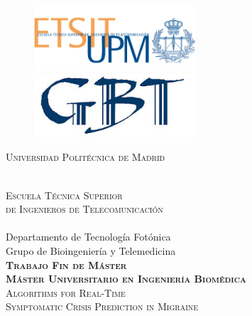 \begin{titlepage}
\setlength{\headheight}{0pt}
\setlength{\footskip}{0pt}
\setlength{\topmargin}{0pt}

\begin{center}

\begin{figure}[ht]
\begin{minipage}[b]{0.45\linewidth}
\centering
\vfill  
\includegraphics[width=6cm]{images/etsit_small}
\end{minipage}
\hspace{2cm}
\begin{minipage}[b]{0.45\linewidth}
\centering
\vfill  
\includegraphics[width=6cm]{images/gbt}
\end{minipage}
\end{figure}


\vspace*{1cm}

\LARGE
\textsc{Universidad Politécnica de Madrid}

\smallskip
\hfill
\\
\textsc{Escuela Técnica Superior\\ de Ingenieros de Telecomunicación}\\ 
\smallskip
\hfill
\\
Departamento de Tecnología Fotónica\\
Grupo de Bioingeniería y Telemedicina\\

\vspace*{2cm} 
\textsc{\textbf{Trabajo Fin de Máster}}\\
{\Large \textsc{\textbf{Máster Universitario en Ingeniería Biomédica}}}\\

\vspace*{2cm} 
\textsc{Algorithms for Real-Time \\ Symptomatic Crisis Prediction in Migraine} \\ %


\end{center}
\end{titlepage}
